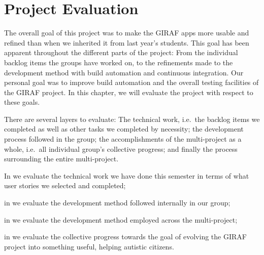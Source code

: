 \chapter{Project Evaluation}\label{chap:evaluation}
The overall goal of this project was to make the GIRAF apps more usable and refined than when we inherited it from last year's students. This goal has been apparent throughout the different parts of the project: From the individual backlog items the groups have worked on, to the refinements made to the development method with build automation and continuous integration. Our personal goal was to improve build automation and the overall testing facilities of the GIRAF project. In this chapter, we will evaluate the project with respect to these goals.

There are several layers to evaluate: The technical work, i.e.\ the backlog items we completed as well as other tasks we completed by necessity; the development process followed in the group; the accomplishments of the multi-project as a whole, i.e.\ all individual group's collective progress; and finally the process surrounding the entire multi-project.

\begin{chapterorganization}
  \item In  we evaluate the technical work we have done this semester in terms of what user stories we selected and completed;
  \item in  we evaluate the development method followed internally in our group;
  \item in  we evaluate the development method employed across the multi-project;
  \item in  we evaluate the collective progress towards the goal of evolving the GIRAF project into something useful, helping autistic citizens.
\end{chapterorganization}

